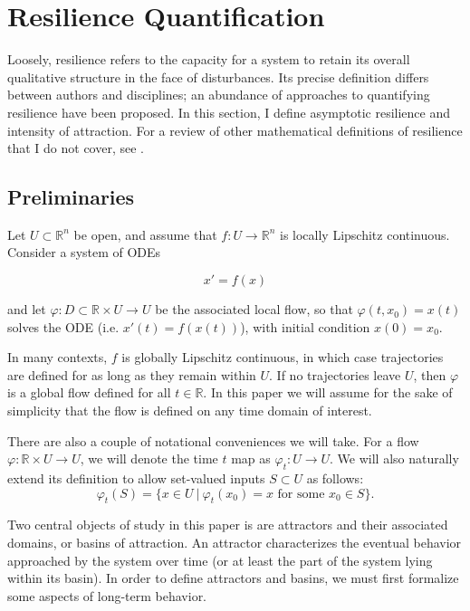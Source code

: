 \section{Resilience Quantification}
\label{sec:resilience}

Loosely, resilience refers to the capacity for a system to retain its overall qualitative structure in the face of disturbances. Its precise definition differs between authors and disciplines; an abundance of approaches to quantifying resilience have been proposed. 
%
In this section, I define asymptotic resilience and intensity of attraction. 
%
For a review of other mathematical definitions of resilience that I do not cover, see \cite{meyerMathematicalReviewResilience2016}.


\subsection{Preliminaries}
Let $U \subset \mathbb{R}^n$ be open, and assume that $f : U \to \mathbb{R}^n$ is locally Lipschitz continuous. Consider a system of ODEs 

\begin{equation}
	\label{eqn:ode}
	x' = f(x)
\end{equation}

and let $\varphi: D \subset \mathbb{R} \times U \to U$ be the associated local flow, so that $\varphi(t,x_0) = x(t)$ solves the ODE (i.e. $x'(t) = f(x(t))$), with initial condition $x(0) = x_0$. 

In many contexts, $f$ is globally Lipschitz continuous, in which case trajectories are defined for as long as they remain within $U$. If no trajectories leave $U$, then $\varphi$ is a global flow defined for all $t \in \mathbb{R}$. In this paper we will assume for the sake of simplicity that the flow is defined on any time domain of interest. 

There are also a couple of notational conveniences we will take. For a flow $\varphi: \mathbb{R} \times U \to U$, we will denote the time $t$ map as $\varphi_t: U \to U$. We will also naturally extend its definition to allow set-valued inputs $S\subset U$ as follows: $$\varphi_t(S) = \{x\in U ~| ~\varphi_t(x_0) = x \text{ for some } x_0 \in S\}.$$

Two central objects of study in this paper is are attractors and their associated domains, or basins of attraction. An attractor characterizes the eventual behavior approached by the system over time (or at least the part of the system lying within its basin).
In order to define attractors and basins, we must first formalize some aspects of long-term behavior.

